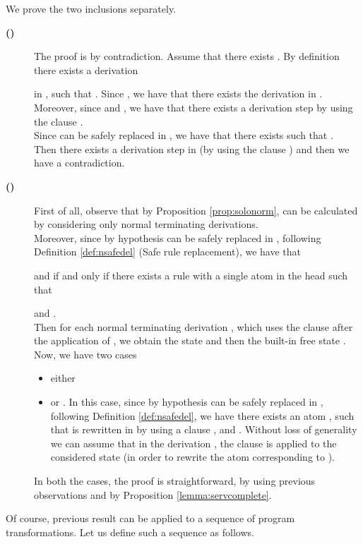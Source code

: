 \documentclass[final]{acmtrans2e}
\begin{document}
We prove the two inclusions separately.
\begin{description}
  \item[{\bf () }]
  The proof is by contradiction. Assume that there exists . By definition there exists a derivation
  
in , such that . Since , we have that there exists the derivation
 in . Moreover, since  and , we have that there exists a derivation step  by using the clause . \\
Since  can be safely replaced
in , we have that there exists  such that
. \\
Then there exists a derivation step  in  (by using the clause ) and then we have a contradiction.


  \item[{\bf () }]
  First of all, observe that by Proposition \ref{prop:solonorm},
   can be calculated by
considering only normal terminating derivations. \\
Moreover, since  by hypothesis
 can be safely replaced
in , following Definition \ref{def:nsafedel} (Safe rule replacement), we have that

and
 if and only if there exists a rule
      with a single atom in the head such that
 
and .\\
Then for each normal terminating derivation , which uses the clause  after the application of , we obtain the state  and then the built-in free state . Now, we have two cases

\begin{itemize}
\item either 
\item or . In this case, since by hypothesis
 can be safely replaced
in , following Definition \ref{def:nsafedel}, we have there exists an atom
, such that  is rewritten in  by using a clause ,
 and .
Without loss of generality we can assume that in the derivation , the clause  is applied to the considered state  (in order to rewrite the atom  corresponding to ).

\end{itemize}
In both the cases, the proof is straightforward, by using previous observations and by Proposition \ref{lemma:servcomplete}.
\end{description}

\noindent{}



Of course, previous result can be applied to a sequence of program transformations.
Let us define such a sequence as follows.
\end{document}
